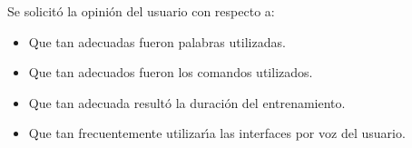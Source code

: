 Se solicit\'o la opini\'on del usuario con respecto a:
\begin{itemize}
	\item Que tan adecuadas fueron palabras utilizadas.
	\item Que tan adecuados fueron los comandos utilizados.
	\item Que tan adecuada result\'o la duraci\'on del entrenamiento.
	\item Que tan frecuentemente utilizar{\'\i}a las interfaces por voz del usuario.
\end{itemize}




